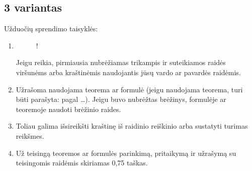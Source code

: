 \documentclass[a4paper]{article}
\newcommand{\germanqq}[1]{{\selectlanguage{german}\glqq#1\grqq\selectlanguage{english}}}
\begin{document}
\vspace{2em}

\subsection*{3 variantas}

Užduočių sprendimo taisyklės:

\begin{enumerate}[label= (\alph*)]

      \item

            \begin{adjustbox}{minipage={\linewidth}, valign=t}

                  \begin{wrapfigure}{t}{0.17\linewidth}

                        \begin{resizebox}{0.17\textwidth}{!}{
                                    }
                        \end{resizebox}
                        \vspace{-2\baselineskip}

                  \end{wrapfigure}

                  \vspace*{0.15em}

                  Jeigu reikia, pirmiausia nubrėžiamas trikampis ir suteikiamos
                  raidės viršunėms arba kraštinėmis naudojantis jūsų vardo ar
                  pavardės raidėmis.
            \end{adjustbox}

      \item \parbox{0.8\textwidth}{
                  Užrašoma naudojama teorema ar formulė (jeigu
                  naudojama teorema, turi būti parašyta: \germanqq{pagal
                        \ldots }). Jeigu buvo nubrėžtas brėžinys, formulėje ar
                  teoremoje naudoti brėžinio raides.
            }

      \item \parbox{0.7\textwidth}{
                  Toliau galima išsireikšti kraštinę iš
                  raidinio reiškinio arba sustatyti turimas
                  reikšmes.
            }

      \item \parbox{0.7\textwidth}{ Už teisingą teoremos ar formulės parinkimą,
                  pritaikymą ir užrašymą su teisingomis raidėmis skiriamas 0,75
                  taškas.}
\end{enumerate}
\end{document}
